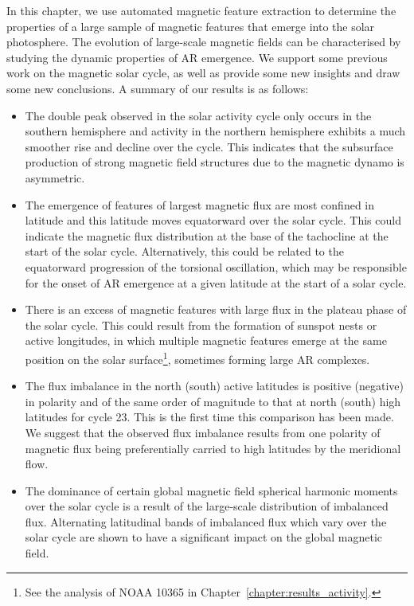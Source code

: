 In this chapter, we use automated magnetic feature extraction to determine the properties of a large sample of magnetic features that emerge into the solar photosphere. The evolution of large-scale magnetic fields can be characterised by studying the dynamic properties of \gls{AR} emergence. We support some previous work on the magnetic solar cycle, as well as provide some new insights and draw some new conclusions. A summary of our results is as follows: 
\begin{itemize}
\item The double peak observed in the solar activity cycle only occurs in the southern hemisphere and activity in the northern hemisphere exhibits a much smoother rise and decline over the cycle. This indicates that the subsurface production of strong magnetic field structures due to the magnetic dynamo is asymmetric. 
\item The emergence of features of largest magnetic flux are most confined in latitude and this latitude moves equatorward over the solar cycle. This could indicate the magnetic flux distribution at the base of the tachocline at the start of the solar cycle. Alternatively, this could be related to the equatorward progression of the torsional oscillation, which may be responsible for the onset of \gls{AR} emergence at a given latitude at the start of a solar cycle. 
\item There is an excess of magnetic features with large flux in the plateau phase of the solar cycle. This could result from the formation of sunspot nests or active longitudes, in which multiple magnetic features emerge at the same position on the solar surface\footnote{See the analysis of NOAA 10365 in Chapter~\ref{chapter:results_activity}.}, sometimes forming large \gls{AR} complexes.
\item The flux imbalance in the north (south) active latitudes is positive (negative) in polarity and of the same order of magnitude to that at north (south) high latitudes for cycle 23. This is the first time this comparison has been made. We suggest that the observed flux imbalance results from one polarity of magnetic flux being preferentially carried to high latitudes by the meridional flow.
\item The dominance of certain global magnetic field spherical harmonic moments over the solar cycle is a result of the large-scale distribution of imbalanced flux. Alternating latitudinal bands of imbalanced flux which vary over the solar cycle are shown to have a significant impact on the global magnetic field.
\end{itemize}

